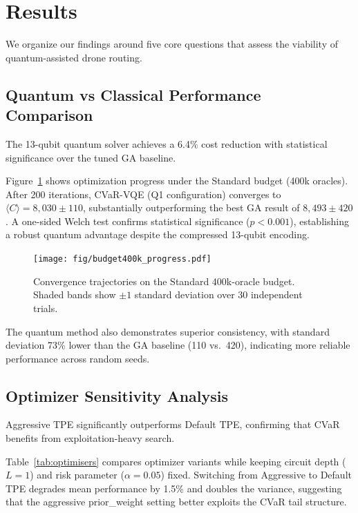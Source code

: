 \section{Results}
\label{sec:results}

We organize our findings around five core questions that assess the viability 
of quantum-assisted drone routing.

\subsection{Quantum vs Classical Performance Comparison}

The 13-qubit quantum solver achieves a 6.4\% cost reduction with statistical 
significance over the tuned GA baseline.

Figure~\ref{fig:budget400k} shows optimization progress under the Standard budget 
(400k oracles). After 200 iterations, CVaR-VQE (Q1 configuration) converges to 
$\langle C\rangle=8{,}030\pm110$, substantially outperforming the best GA result 
of $8{,}493\pm420$. A one-sided Welch test confirms statistical significance 
($p<0.001$), establishing a robust quantum advantage despite the compressed 
13-qubit encoding.

\begin{figure}[h]
  \centering
  \texttt{[image: fig/budget400k\_progress.pdf]}
  \caption{Convergence trajectories on the Standard 400k-oracle budget. 
           Shaded bands show $\pm1$ standard deviation over 30 independent trials.}
  \label{fig:budget400k}
\end{figure}

The quantum method also demonstrates superior consistency, with standard deviation 
73\% lower than the GA baseline (110 vs.\ 420), indicating more reliable 
performance across random seeds.

\subsection{Optimizer Sensitivity Analysis}

Aggressive TPE significantly outperforms Default TPE, confirming that CVaR 
benefits from exploitation-heavy search.

Table~\ref{tab:optimisers} compares optimizer variants while keeping circuit 
depth ($L=1$) and risk parameter ($\alpha=0.05$) fixed. Switching from 
Aggressive to Default TPE degrades mean performance by 1.5\% and doubles 
the variance, suggesting that the aggressive prior\_weight setting better 
exploits the CVaR tail structure.

